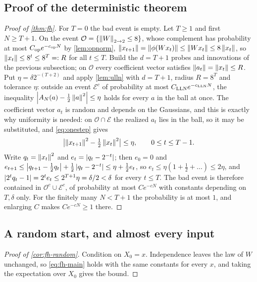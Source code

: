 \subsection{Proof of the deterministic theorem}

\begin{proof}[Proof of \cref{thm:fh}]
For $T=0$ the bad event is empty. Let $T\ge1$ and first $N\ge T+1$. On the event $\mathcal O=\{\left\lVert W\right\rVert_{2\to 2}\le8\}$, whose complement has probability at most $C_{\rm op}e^{-c_{\rm op}N}$ by \cref{lem:opnorm}, $\left\lVert x_{t+1}\right\rVert=\left\lVert \phi(Wx_t)\right\rVert\le\left\lVert Wx_t\right\rVert\le8\left\lVert x_t\right\rVert$, so $\left\lVert x_t\right\rVert\le8^t\le8^T=:R$ for all $t\le T$. Build the $d=T+1$ probes and innovations of the previous subsection; on $\mathcal O$ every coefficient vector satisfies $\left\lVert a_t\right\rVert=\left\lVert x_t\right\rVert\le R$. Put $\eta=\delta2^{-(T+2)}$ and apply \cref{lem:ulln} with $d=T+1$, radius $R=8^T$ and tolerance $\eta$: outside an event $\mathcal E^c$ of probability at most $C_{\rm LLN}e^{-c_{\rm LLN}N}$, the inequality $\left\lvert A_N(a)-\tfrac12\left\lVert a\right\rVert^2\right\rvert\le\eta$ holds for every $a$ in the ball at once. The coefficient vector $a_t$ is random and depends on the Gaussians, and this is exactly why uniformity is needed: on $\mathcal O\cap\mathcal E$ the realized $a_t$ lies in the ball, so it may be substituted, and \cref{eq:onestep} gives
\[
\bigl|\left\lVert x_{t+1}\right\rVert^2-\tfrac12\left\lVert x_t\right\rVert^2\bigr|\le\eta,\qquad0\le t\le T-1 .
\]
Write $q_t=\left\lVert x_t\right\rVert^2$ and $e_t=\left\lvert q_t-2^{-t}\right\rvert$; then $e_0=0$ and $e_{t+1}\le\left\lvert q_{t+1}-\tfrac12q_t\right\rvert+\tfrac12\left\lvert q_t-2^{-t}\right\rvert\le\eta+\tfrac12e_t$, so $e_t\le\eta(1+\tfrac12+\dots)\le2\eta$, and $\left\lvert 2^tq_t-1\right\rvert=2^te_t\le2^{T+1}\eta=\delta/2<\delta$ for every $t\le T$. The bad event is therefore contained in $\mathcal O^c\cup\mathcal E^c$, of probability at most $Ce^{-cN}$ with constants depending on $T,\delta$ only. For the finitely many $N<T+1$ the probability is at most $1$, and enlarging $C$ makes $Ce^{-cN}\ge1$ there.
\end{proof}

\subsection{A random start, and almost every input}

\begin{proof}[Proof of \cref{cor:fh-random}]
Condition on $X_0=x$. Independence leaves the law of $W$ unchanged, so \cref{eq:fh-main} holds with the same constants for every $x$, and taking the expectation over $X_0$ gives the bound.
\end{proof}

